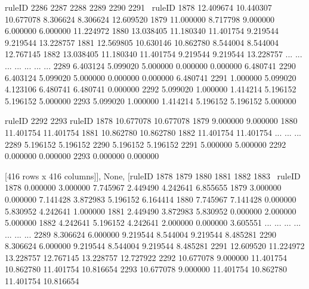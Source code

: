 ruleID       2286       2287       2288      2289      2290       2291  \
ruleID                                                                   
1878    12.409674  10.440307  10.677078  8.306624  8.306624  12.609520   
1879    11.000000   8.717798   9.000000  6.000000  6.000000  11.224972   
1880    13.038405  11.180340  11.401754  9.219544  9.219544  13.228757   
1881    12.569805  10.630146  10.862780  8.544004  8.544004  12.767145   
1882    13.038405  11.180340  11.401754  9.219544  9.219544  13.228757   
...           ...        ...        ...       ...       ...        ...   
2289     6.403124   5.099020   5.000000  0.000000  0.000000   6.480741   
2290     6.403124   5.099020   5.000000  0.000000  0.000000   6.480741   
2291     1.000000   5.099020   4.123106  6.480741  6.480741   0.000000   
2292     5.099020   1.000000   1.414214  5.196152  5.196152   5.000000   
2293     5.099020   1.000000   1.414214  5.196152  5.196152   5.000000   

ruleID       2292       2293  
ruleID                        
1878    10.677078  10.677078  
1879     9.000000   9.000000  
1880    11.401754  11.401754  
1881    10.862780  10.862780  
1882    11.401754  11.401754  
...           ...        ...  
2289     5.196152   5.196152  
2290     5.196152   5.196152  
2291     5.000000   5.000000  
2292     0.000000   0.000000  
2293     0.000000   0.000000  

[416 rows x 416 columns]], None, [ruleID       1878       1879       1880       1881       1882       1883  \
ruleID                                                                     
1878     0.000000   3.000000   7.745967   2.449490   4.242641   6.855655   
1879     3.000000   0.000000   7.141428   3.872983   5.196152   6.164414   
1880     7.745967   7.141428   0.000000   5.830952   4.242641   1.000000   
1881     2.449490   3.872983   5.830952   0.000000   2.000000   5.000000   
1882     4.242641   5.196152   4.242641   2.000000   0.000000   3.605551   
...           ...        ...        ...        ...        ...        ...   
2289     8.306624   6.000000   9.219544   8.544004   9.219544   8.485281   
2290     8.306624   6.000000   9.219544   8.544004   9.219544   8.485281   
2291    12.609520  11.224972  13.228757  12.767145  13.228757  12.727922   
2292    10.677078   9.000000  11.401754  10.862780  11.401754  10.816654   
2293    10.677078   9.000000  11.401754  10.862780  11.401754  10.816654   

